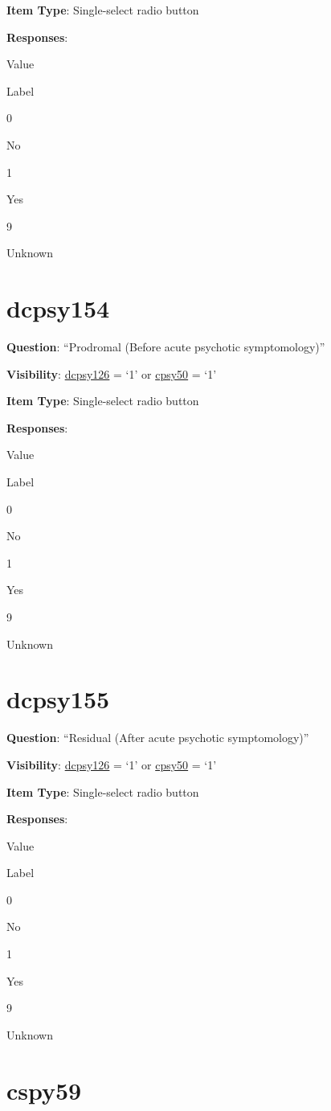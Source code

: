 \documentclass[]{book}
\begin{document}
\textbf{Item Type}: Single-select radio button

\textbf{Responses}:

Value

Label

0

No

1

Yes

9

Unknown

\hypertarget{dcpsy154}{%
\section{dcpsy154}\label{dcpsy154}}

\textbf{Question}: ``Prodromal (Before acute psychotic symptomology)''

\textbf{Visibility}: \protect\hyperlink{dcpsy126}{dcpsy126} = `1' or \protect\hyperlink{cpsy50}{cpsy50} = `1'

\textbf{Item Type}: Single-select radio button

\textbf{Responses}:

Value

Label

0

No

1

Yes

9

Unknown

\hypertarget{dcpsy155}{%
\section{dcpsy155}\label{dcpsy155}}

\textbf{Question}: ``Residual (After acute psychotic symptomology)''

\textbf{Visibility}: \protect\hyperlink{dcpsy126}{dcpsy126} = `1' or \protect\hyperlink{cpsy50}{cpsy50} = `1'

\textbf{Item Type}: Single-select radio button

\textbf{Responses}:

Value

Label

0

No

1

Yes

9

Unknown

\hypertarget{cspy59}{%
\section{cspy59}\label{cspy59}}
\end{document}
